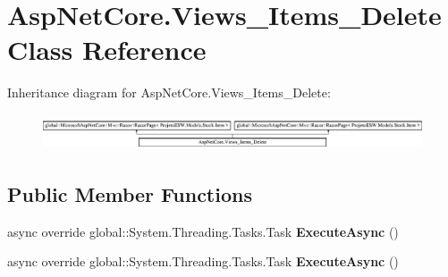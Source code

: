 \hypertarget{class_asp_net_core_1_1_views___items___delete}{}\section{Asp\+Net\+Core.\+Views\+\_\+\+Items\+\_\+\+Delete Class Reference}
\label{class_asp_net_core_1_1_views___items___delete}
Inheritance diagram for Asp\+Net\+Core.\+Views\+\_\+\+Items\+\_\+\+Delete\+:\begin{figure}[H]
\begin{center}
\leavevmode
\includegraphics[height=1.083172cm]{class_asp_net_core_1_1_views___items___delete}
\end{center}
\end{figure}
\subsection*{Public Member Functions}
\begin{DoxyCompactItemize}
\item 
\mbox{\label{class_asp_net_core_1_1_views___items___delete_a900eb720a14725c7be322432a5d5af96}} 
async override global\+::\+System.\+Threading.\+Tasks.\+Task {\bfseries Execute\+Async} ()
\item 
\mbox{\label{class_asp_net_core_1_1_views___items___delete_a900eb720a14725c7be322432a5d5af96}} 
async override global\+::\+System.\+Threading.\+Tasks.\+Task {\bfseries Execute\+Async} ()
\end{DoxyCompactItemize}
